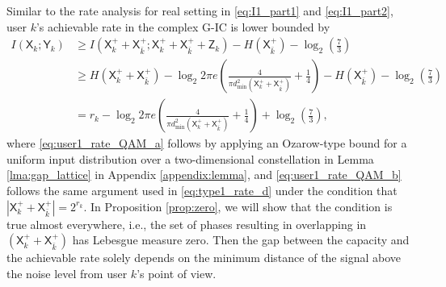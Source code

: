 \documentclass[12pt, draftclsnofoot, onecolumn]{IEEEtran}
\newcommand{\msf}[1]{\mathsf{#1}}
\theoremstyle{definition}
\begin{document}
Similar to the rate analysis for real setting in \eqref{eq:I1_part1} and \eqref{eq:I1_part2}, user $k$'s achievable rate in the complex G-IC is lower bounded by
\begin{subequations}\label{eq:user1_rate_QAM}
\begin{align}
I(\msf{X}_k;\msf{Y}_k)
&\geq I(\msf{X}_k^{+}+\msf{X}_{\bar{k}}^{+};\msf{X}_k^{+}+\msf{X}_{\bar{k}}^{+}+\msf{Z}_k)-H(\msf{X}^{+}_{\bar{k}})-\log_2\left(\frac{7}{3}\right) \nonumber \\
&\geq H(\msf{X}_k^{+}+\msf{X}_{\bar{k}}^{+}) - \log_2 2\pi e \left(\frac{4}{\pi d^2_{\min}(\msf{X}_k^{+}+\msf{X}_{\bar{k}}^{+})} + \frac{1}{4}\right)-H(\msf{X}^{+}_{\bar{k}})-\log_2\left(\frac{7}{3}\right)  \label{eq:user1_rate_QAM_a}\\
&= r_k - \log_2 2\pi e \left(\frac{4}{\pi d^2_{\min}(\msf{X}_k^{+}+\msf{X}_{\bar{k}}^{+})} + \frac{1}{4}\right)+\log_2\left(\frac{7}{3}\right),\label{eq:user1_rate_QAM_b}
\end{align}
\end{subequations}
where \eqref{eq:user1_rate_QAM_a} follows by applying an Ozarow-type bound \cite{ozarow90} for a uniform input distribution over a two-dimensional constellation in Lemma \ref{lma:gap_lattice} in Appendix \ref{appendix:lemma}, and \eqref{eq:user1_rate_QAM_b} follows the same argument used in \eqref{eq:type1_rate_d} under the condition that $|\msf{X}_k^{+}+\msf{X}_{\bar{k}}^{+}| = 2^{r_k}$. In Proposition \ref{prop:zero}, we will show that the condition is true almost everywhere, i.e., the set of phases resulting in overlapping in $(\msf{X}_k^{+}+\msf{X}_{\bar{k}}^{+})$ has Lebesgue measure zero. Then the gap between the capacity and the achievable rate solely depends on the minimum distance of the signal above the noise level from user $k$'s point of view.
\end{document}
